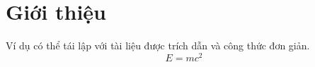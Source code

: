 \section{Giới thiệu}
Ví dụ có thể tái lập với tài liệu được trích dẫn và công thức đơn giản.
\[E=mc^2\]
